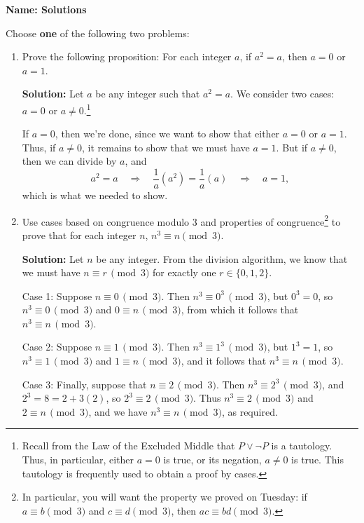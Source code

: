 \documentclass[12pt]{article}
\newcommand{\modd}[3]{#1\equiv #2\,\pmod{#3}}
\begin{document}
{\bf Name: Solutions}
\thispagestyle{fancy}

\bigskip
Choose {\bf one} of the following two problems:
\begin{enumerate}
 \item Prove the following proposition: For each integer $a$, if $a^2=a$, then $a=0$ or $a=1$.
 
\bigskip

{\bf Solution:} Let $a$ be any integer such that $a^2=a$. We consider two cases: $a=0$ or $a\neq 0$.\footnote{Recall from the Law of the Excluded Middle that $P\vee \neg P$ is a tautology. Thus, in particular, either $a=0$ is true, or its negation, $a\neq 0$ is true. This tautology is frequently used to obtain a proof by cases.}

If $a=0$, then we're done, since we want to show that either $a=0$ or $a=1$. Thus, if $a\neq 0$, it remains to show that we must have $a=1$. But if $a\neq 0$, then we can divide by $a$, and
\[
 a^2=a \quad \Rightarrow \quad \frac{1}{a}(a^2) = \frac{1}{a}(a) \quad  \Rightarrow \quad a = 1,
\]
which is what we needed to show.

\bigskip

\item Use cases based on congruence modulo 3 and properties of congruence\footnote{In particular, you will want the property we proved on Tuesday: if $a\equiv b \pmod{3}$ and $c\equiv d\pmod{3}$, then $ac\equiv bd\pmod{3}$.} to prove that for each integer $n$, $n^3\equiv n \pmod{3}$.

\bigskip

{\bf Solution:} Let $n$ be any integer. From the division algorithm, we know that we must have $\modd{n}{r}{3}$ for exactly one $r\in \{0,1,2\}$.

Case 1: Suppose $\modd{n}{0}{3}$. Then $\modd{n^3}{0^3}{3}$, but $0^3=0$, so $\modd{n^3}{0}{3}$ and $\modd{0}{n}{3}$, from which it follows that $\modd{n^3}{n}{3}$. 

\medskip

Case 2: Suppose $\modd{n}{1}{3}$. Then $\modd{n^3}{1^3}{3}$, but $1^3=1$, so $\modd{n^3}{1}{3}$ and $\modd{1}{n}{3}$, and it follows that $\modd{n^3}{n}{3}$.

\medskip

Case 3: Finally, suppose that $\modd{n}{2}{3}$. Then $\modd{n^3}{2^3}{3}$, and $2^3=8 = 2+3(2)$, so $\modd{2^3}{2}{3}$. Thus $\modd{n^3}{2}{3}$ and $\modd{2}{n}{3}$, and we have $\modd{n^3}{n}{3}$, as required.

\end{enumerate}
\end{document}
